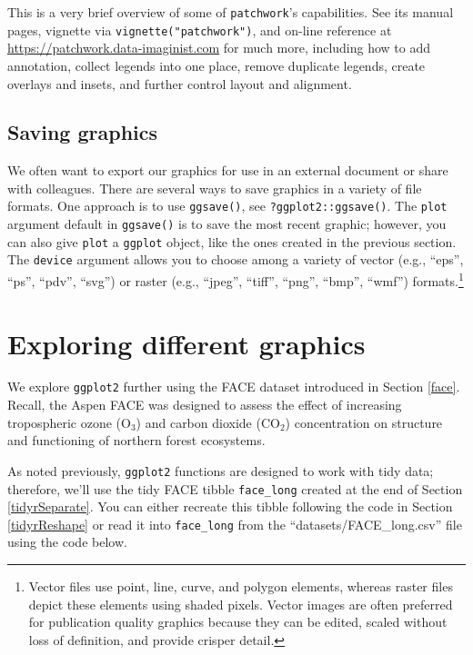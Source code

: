 \documentclass[
  11pt,
]{krantz}
\theoremstyle{definition}
\theoremstyle{definition}
\theoremstyle{definition}
\theoremstyle{definition}
\theoremstyle{remark}
\begin{document}
This is a very brief overview of some of \texttt{patchwork}'s capabilities. See its manual pages, vignette via \texttt{vignette("patchwork")}, and on-line reference at \url{https://patchwork.data-imaginist.com} for much more, including how to add annotation, collect legends into one place, remove duplicate legends, create overlays and insets, and further control layout and alignment.

\hypertarget{saving-graphics}{%
\subsection{Saving graphics}\label{saving-graphics}}

We often want to export our graphics for use in an external document or share with colleagues. There are several ways to save graphics in a variety of file formats. One approach is to use \texttt{ggsave()}, see \texttt{?ggplot2::ggsave()}. The \texttt{plot} argument default in \texttt{ggsave()} is to save the most recent graphic; however, you can also give \texttt{plot} a \texttt{ggplot} object, like the ones created in the previous section. The \texttt{device} argument allows you to choose among a variety of vector (e.g., ``eps'', ``ps'', ``pdv'', ``svg'') or raster (e.g., ``jpeg'', ``tiff'', ``png'', ``bmp'', ``wmf'') formats.\footnote{Vector files use point, line, curve, and polygon elements, whereas raster files depict these elements using shaded pixels. Vector images are often preferred for publication quality graphics because they can be edited, scaled without loss of definition, and provide crisper detail.}

\hypertarget{exploring-different-graphics}{%
\section{Exploring different graphics}\label{exploring-different-graphics}}

We explore \texttt{ggplot2} further using the FACE dataset introduced in Section \ref{face}. Recall, the Aspen FACE was designed to assess the effect of increasing tropospheric ozone (O\(_3\)) and carbon dioxide (CO\(_2\)) concentration on structure and functioning of northern forest ecosystems.

As noted previously, \texttt{ggplot2} functions are designed to work with tidy data; therefore, we'll use the tidy FACE tibble \texttt{face\_long} created at the end of Section \ref{tidyrSeparate}. You can either recreate this tibble following the code in Section \ref{tidyrReshape} or read it into \texttt{face\_long} from the ``datasets/FACE\_long.csv'' file using the code below.
\end{document}
